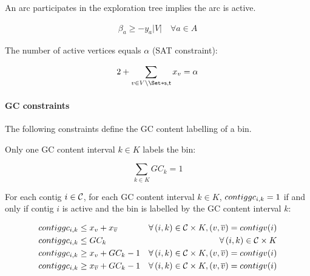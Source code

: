 An arc participates in the exploration tree implies the arc is active.
\begin{Constraint}
  \begin{align}
    \beta_a \geq - y_a |V| \quad \forall a \in A
    \label{pbf_iterbin:milp:cst:ccomp:tree_arc_active} %
  \end{align}
\end{Constraint}

The number of active vertices equals \(\alpha{}\) (SAT constraint):
\begin{Constraint}
  \begin{align}
    2 + \sum_{v \in V \setminus \Set*{\source{}, \sink{}}} x_v = \alpha
    \label{pbf_iterbin:milp:cst:ccomp:number_of_active_vertices} %
  \end{align}
\end{Constraint}

\paragraph{GC constraints}
%
The following constraints define the GC content labelling of a bin.

\phantom{text}

Only one GC content interval \(k \in K\) labels the bin:
\begin{Constraint}
  \begin{equation}
    \sum_{k \in K} GC_k = 1
    \label{pbf_iterbin:milp:cst:gc:exactly_one_gc_content_interval} %
  \end{equation}
\end{Constraint}

For each contig \(i \in \mathcal{C}{}\), for each GC content interval \(k \in K\), \(contiggc_{i, k} = 1\) if and only if contig \(i\) is active and the bin is labelled by the GC content interval \(k\):
\begin{Constraint}
  \begin{align}
    \contiggc{i}{k} & \leq x_{v} + x_{\rev{v}} & \forall (i, k) \in \Contigs{} \times K, (v, \rev{v}) = contigv(i) \label{pbf_iterbin:milp:cst:gc:active_contig_gc_1} \\ %
    \contiggc{i}{k} & \leq GC_k & \forall (i, k) \in \Contigs{} \times K \label{pbf_iterbin:milp:cst:gc:active_contig_gc_2} \\ %
    \contiggc{i}{k} & \geq x_{v} + GC_k - 1 & \forall (i, k) \in \Contigs{} \times K, (v, \rev{v}) = contigv(i) \label{pbf_iterbin:milp:cst:gc:active_contig_gc_3} \\ %
    \contiggc{i}{k} & \geq x_{\rev{v}} + GC_k - 1 & \forall (i, k) \in \Contigs{} \times K, (v, \rev{v}) = contigv(i) \label{pbf_iterbin:milp:cst:gc:active_contig_gc_4} %
  \end{align}
\end{Constraint}

